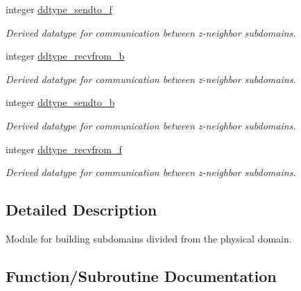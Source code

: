 \textbf{ }\par
\begin{DoxyCompactItemize}
\item 
integer \mbox{\hyperlink{namespacemodule__mpi__subdomain_aed4d71ca15cfe63b676efed68f82e313}{ddtype\+\_\+sendto\+\_\+f}}
\begin{DoxyCompactList}\small\item\em Derived datatype for communication between z-\/neighbor subdomains. \end{DoxyCompactList}\item 
integer \mbox{\hyperlink{namespacemodule__mpi__subdomain_af629d0205c8f2b9528e52b300b0586d4}{ddtype\+\_\+recvfrom\+\_\+b}}
\begin{DoxyCompactList}\small\item\em Derived datatype for communication between z-\/neighbor subdomains. \end{DoxyCompactList}\item 
integer \mbox{\hyperlink{namespacemodule__mpi__subdomain_a2c99ccbd4e672593f4b2068ed3bc1c5a}{ddtype\+\_\+sendto\+\_\+b}}
\begin{DoxyCompactList}\small\item\em Derived datatype for communication between z-\/neighbor subdomains. \end{DoxyCompactList}\item 
integer \mbox{\hyperlink{namespacemodule__mpi__subdomain_a1af70aeca9de9289ff16adbd2d6f8bd8}{ddtype\+\_\+recvfrom\+\_\+f}}
\begin{DoxyCompactList}\small\item\em Derived datatype for communication between z-\/neighbor subdomains. \end{DoxyCompactList}\end{DoxyCompactItemize}



\subsection{Detailed Description}
Module for building subdomains divided from the physical domain. 

\subsection{Function/\+Subroutine Documentation}
\mbox{\label{namespacemodule__mpi__subdomain_a3ebf20fcc8a3cd5d916adddf69af4833}} 
